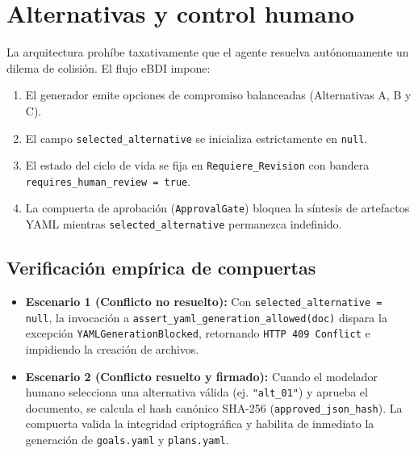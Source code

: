 \documentclass[11pt,a4paper]{article}
\begin{document}
\section{Alternativas y control humano}
La arquitectura prohíbe taxativamente que el agente resuelva autónomamente un dilema de colisión. El flujo eBDI impone:
\begin{enumerate}
    \item El generador emite opciones de compromiso balanceadas (Alternativas A, B y C).
    \item El campo \texttt{selected\_alternative} se inicializa estrictamente en \texttt{null}.
    \item El estado del ciclo de vida se fija en \texttt{Requiere\_Revision} con bandera \texttt{requires\_human\_review = true}.
    \item La compuerta de aprobación (\texttt{ApprovalGate}) bloquea la síntesis de artefactos YAML mientras \texttt{selected\_alternative} permanezca indefinido.
\end{enumerate}

\subsection{Verificación empírica de compuertas}
\begin{itemize}
    \item \textbf{Escenario 1 (Conflicto no resuelto):} Con \texttt{selected\_alternative = null}, la invocación a \texttt{assert\_yaml\_generation\_allowed(doc)} dispara la excepción \texttt{YAMLGenerationBlocked}, retornando \texttt{HTTP 409 Conflict} e impidiendo la creación de archivos.
    \item \textbf{Escenario 2 (Conflicto resuelto y firmado):} Cuando el modelador humano selecciona una alternativa válida (ej. \texttt{"alt\_01"}) y aprueba el documento, se calcula el hash canónico SHA-256 (\texttt{approved\_json\_hash}). La compuerta valida la integridad criptográfica y habilita de inmediato la generación de \texttt{goals.yaml} y \texttt{plans.yaml}.
\end{itemize}

\end{document}
